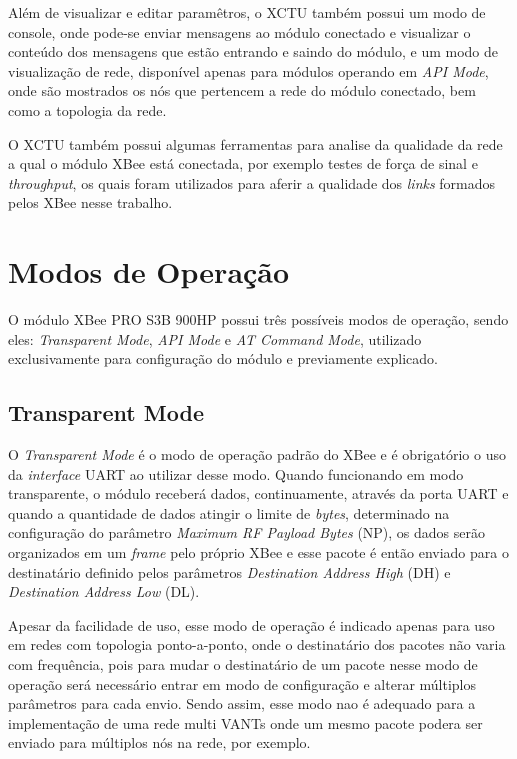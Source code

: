 Além de visualizar e editar paramêtros, o XCTU também possui um modo de console, onde pode-se enviar mensagens ao módulo conectado e visualizar o conteúdo dos mensagens que estão entrando e saindo do módulo, e um modo de visualização de rede, disponível apenas para módulos operando em \emph{API Mode}, onde são mostrados os nós que pertencem a rede do módulo conectado, bem como a topologia da rede.

O XCTU também possui algumas ferramentas para analise da qualidade da rede a qual o módulo XBee está conectada, por exemplo testes de força de sinal e \emph{throughput}, os quais foram utilizados para aferir a qualidade dos \emph{links} formados pelos XBee nesse trabalho.

\section{Modos de Operação}

O módulo XBee PRO S3B 900HP possui três possíveis modos de operação, sendo eles: \emph{Transparent Mode}, \emph{API Mode} e \emph{AT Command Mode}, utilizado exclusivamente para configuração do módulo e previamente explicado.

\subsection{Transparent Mode}

O \emph{Transparent Mode} é o modo de operação padrão do XBee e é obrigatório o uso da \emph{interface} UART ao utilizar desse modo. Quando funcionando em modo transparente, o módulo receberá dados, continuamente, através da porta UART e quando a quantidade de dados atingir o limite de \emph{bytes}, determinado na configuração do parâmetro \emph{Maximum RF Payload Bytes} (NP), os dados serão organizados em um \emph{frame} pelo próprio XBee e esse pacote é então enviado para o destinatário definido pelos parâmetros \emph{Destination Address High} (DH) e \emph{Destination Address Low} (DL). 

Apesar da facilidade de uso, esse modo de operação é indicado apenas para uso em redes com topologia ponto-a-ponto, onde o destinatário dos pacotes não varia com frequência, pois para mudar o destinatário de um pacote nesse modo de operação será necessário entrar em modo de configuração e alterar múltiplos parâmetros para cada envio. Sendo assim, esse modo nao é adequado para a implementação de uma rede multi VANTs onde um mesmo pacote podera ser enviado para múltiplos nós na rede, por exemplo.

